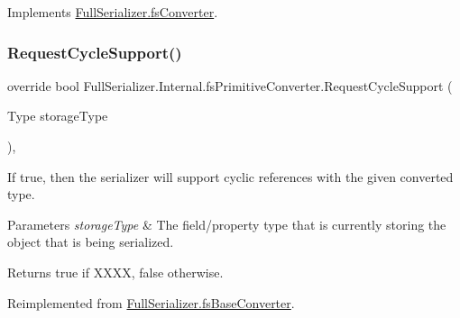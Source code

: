 Implements \hyperlink{class_full_serializer_1_1fs_converter_a6d9e084c5e7f646a8d220705efaecb35}{Full\+Serializer.\+fs\+Converter}.

\mbox{\label{class_full_serializer_1_1_internal_1_1fs_primitive_converter_a69a650703493e76171dff70be6ebec7c}} 
\subsubsection{\texorpdfstring{Request\+Cycle\+Support()}{RequestCycleSupport()}}
{\footnotesize\ttfamily override bool Full\+Serializer.\+Internal.\+fs\+Primitive\+Converter.\+Request\+Cycle\+Support (\begin{DoxyParamCaption}\item[{Type}]{storage\+Type }\end{DoxyParamCaption})\hspace{0.3cm}{\ttfamily [inline]}, {\ttfamily [virtual]}}



If true, then the serializer will support cyclic references with the given converted type. 


\begin{DoxyParams}{Parameters}
{\em storage\+Type} & The field/property type that is currently storing the object that is being serialized.\\
\hline
\end{DoxyParams}
\begin{DoxyReturn}{Returns}
{\ttfamily true} if X\+X\+XX, {\ttfamily false} otherwise.
\end{DoxyReturn}


Reimplemented from \hyperlink{class_full_serializer_1_1fs_base_converter_a4e850ab88cea1b89771c00e0b65febcd}{Full\+Serializer.\+fs\+Base\+Converter}.

\mbox{\label{class_full_serializer_1_1_internal_1_1fs_primitive_converter_a96bfa5776105d8d9fffb1fd01c53af2e}} 
